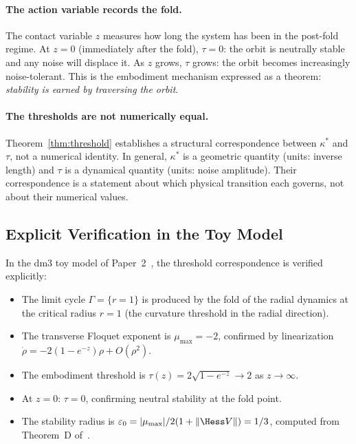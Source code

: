 \paragraph{The action variable records the fold.}
The contact variable $z$ measures how long the system has been
in the post-fold regime. At $z=0$ (immediately after the fold),
$\tau=0$: the orbit is neutrally stable and any noise will
displace it. As $z$ grows, $\tau$ grows: the orbit becomes
increasingly noise-tolerant. This is the embodiment mechanism
expressed as a theorem: \emph{stability is earned by traversing
the orbit}.

\paragraph{The thresholds are not numerically equal.}
Theorem~\ref{thm:threshold} establishes a structural
correspondence between $\kappa^*$ and $\tau$, not a numerical
identity. In general, $\kappa^*$ is a geometric quantity
(units: inverse length) and $\tau$ is a dynamical quantity
(units: noise amplitude). Their correspondence is a statement
about which physical transition each governs, not about their
numerical values.

\subsection{Explicit Verification in the Toy Model}
\label{subsec:toy-verification}

In the dm3 toy model of Paper~2~\cite{Paper2}, the threshold
correspondence is verified explicitly:

\begin{itemize}[leftmargin=*]
  \item The limit cycle $\Gamma=\{r=1\}$ is produced by the
        fold of the radial dynamics at the critical radius
        $r=1$ (the curvature threshold in the radial direction).
  \item The transverse Floquet exponent is $\mu_{\max}=-2$,
        confirmed by linearization
        $\dot\rho=-2(1-e^{-z})\rho+O(\rho^2)$.
  \item The embodiment threshold is
        $\tau(z)=2\sqrt{1-e^{-z}}\to 2$ as $z\to\infty$.
  \item At $z=0$: $\tau=0$, confirming neutral stability
        at the fold point.
  \item The stability radius is
        $\varepsilon_0 = |\mu_{\max}|/2(1+\|\Hess V\|) = 1/3$,
        computed from Theorem~D of~\cite{Paper1}.
\end{itemize}

